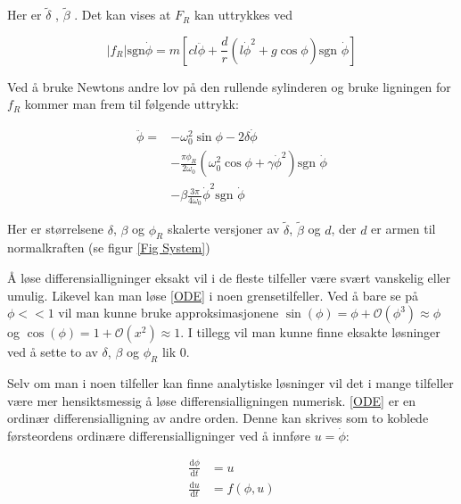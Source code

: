 \documentclass[5p]{elsarticle}
\newcommand{\dd}[2]{\frac{\mathrm{d}{#1}}{\mathrm{d}{#2}}} %
\begin{document}
Her er \(\tilde{\delta}\) , \(\tilde{\beta}\) .
Det kan vises at \(F_R\) kan uttrykkes ved

\begin{equation}
	|f_R|\text{sgn}\dot{\phi} =
	m\left[
		cl\ddot{\phi}+\frac{d}{r}
		\left(l\dot{\phi}^2 + g\cos\phi\right)
		\text{sgn }\dot{\phi}
	\right]
\end{equation}

Ved å bruke Newtons andre lov på den rullende sylinderen 
og bruke ligningen for \(f_R\) kommer man frem til følgende uttrykk:

\begin{equation}
	\begin{split}
		\label{ODE}	
		\ddot{\phi} = 	
		&- \omega_0^2\sin\phi - 2\delta\dot{\phi}	\\
		&- \frac{\pi\phi_R}{2\omega_0}
		\left(\omega_0^2\cos\phi + \gamma\dot{\phi}^2\right) \text{sgn } \dot{\phi} \\
		&- \beta \frac{3\pi}{4\omega_0}\dot{\phi}^2\text{sgn }\dot{\phi} 
	\end{split}
\end{equation}

Her er størrelsene \(\delta\), \(\beta\) og \(\phi_R\) skalerte versjoner av 
\(\tilde{\delta}\), \(\tilde{\beta}\) og \(d\), der \(d\) er armen til normalkraften (se figur \ref{Fig System})

Å løse differensialligninger eksakt vil i de fleste tilfeller være svært vanskelig eller umulig.
Likevel kan man løse \eqref{ODE} i noen grensetilfeller. Ved å bare se på \(\phi << 1\) vil man kunne
bruke approksimasjonene 
\(\sin(\phi) = \phi + \mathcal{O}(\phi^3) \approx \phi\) og 
\(\cos(\phi) = 1 + \mathcal{O}(x^2) \approx 1\).
I tillegg vil man kunne finne eksakte løsninger ved å sette to av \(\delta\), \(\beta\) og \(\phi_R\) lik 0.
\par
Selv om man i noen tilfeller kan finne analytiske løsninger 
vil det i mange tilfeller være mer hensiktsmessig å løse differensialligningen numerisk.
\eqref{ODE} er en ordinær differensialligning av andre orden. 
Denne kan skrives som to koblede førsteordens ordinære differensialligninger ved å innføre \(u = \dot{\phi}\):

\begin{subequations}
	\begin{align}
		\dd{\phi}{t} & = u \\
		\dd{u}{t}    & = f(\phi, u) \\
	\end{align}
\end{subequations}
\end{document}
